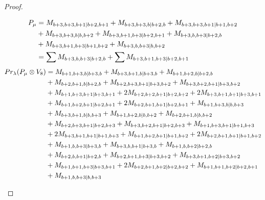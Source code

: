 \begin{proof}
\begin{enumerate}
\begin{enumerate}
        \begin{equation}\notag
          \begin{aligned}
            P_\mu &= M_{b+3,b+3,b+1|b+2,b+1}
+M_{b+3,b+3,b|b+2,b}
+M_{b+3,b+3,b+1|b+1,b+2}\\
                                              &
+M_{b+3,b+3,b|b,b+2}
+M_{b+3,b+1,b+3|b+2,b+1}
+M_{b+3,b,b+3|b+2,b}\\
                                              &
+M_{b+3,b+1,b+3|b+1,b+2}
+M_{b+3,b,b+3|b,b+2}\\
                  &=
\sum M_{b+3,b,b+3|b+2,b}
+\sum M_{b+3,b+1,b+3|b+2,b+1}
          \end{aligned}
        \end{equation}
        \begin{equation}\notag
          \begin{aligned}
            Pr_{\lambda}(P_\mu \otimes V_{8}) &=
M_{b+1,b+3,b|b+3,b}
+ M_{b+3,b+1,b|b+3,b}
+ M_{b+1,b+2,b|b+2,b} \\
                                              &
+ M_{b+2,b+1,b|b+2,b}
+ M_{b+2,b+3,b+1|b+3,b+2}
+ M_{b+3,b+2,b+1|b+3,b+2}\\
                                              &
+ M_{b+1,b+3,b+1|b+3,b+1}
+ 2M_{b+2,b+2,b+1|b+2,b+2}
+ 2M_{b+3,b+1,b+1|b+3,b+1}\\
                                              &
+ M_{b+1,b+2,b+1|b+2,b+1}
+ 2M_{b+2,b+1,b+1|b+2,b+1}
+ M_{b+1,b+3,b|b,b+3}\\
                                              &
+ M_{b+3,b+1,b|b,b+3}
+ M_{b+1,b+2,b|b,b+2}
+ M_{b+2,b+1,b|b,b+2}\\
                                              &
+ M_{b+2,b+3,b+1|b+2,b+3}
+ M_{b+3,b+2,b+1|b+2,b+3}
+ M_{b+1,b+3,b+1|b+1,b+3}\\
                                              &
+ 2M_{b+3,b+1,b+1|b+1,b+3}
+ M_{b+1,b+2,b+1|b+1,b+2}
+ 2M_{b+2,b+1,b+1|b+1,b+2}\\
                                              &
+ M_{b+1,b,b+3|b+3,b}
+ M_{b+3,b,b+1|b+3,b}
+ M_{b+1,b,b+2|b+2,b}\\
                                              &
+ M_{b+2,b,b+1|b+2,b}
+ M_{b+2,b+1,b+3|b+3,b+2}
+ M_{b+3,b+1,b+2|b+3,b+2}\\
                                              &
+ M_{b+1,b+1,b+3|b+3,b+1}
+ 2M_{b+2,b+1,b+2|b+2,b+2}
+ M_{b+1,b+1,b+2|b+2,b+1}\\
                                              &
+ M_{b+1,b,b+3|b,b+3}

\end{aligned}
\end{equation}
\end{enumerate}
\end{enumerate}
\end{proof}
